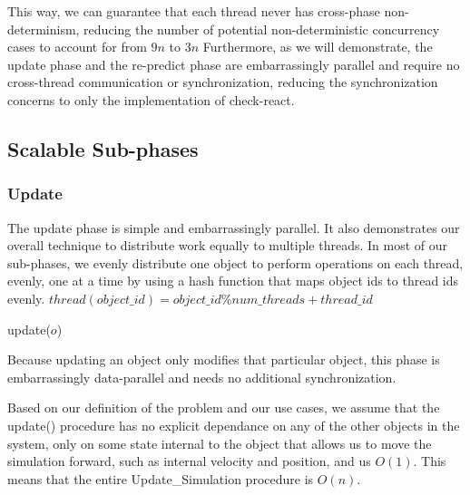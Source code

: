 \documentclass[CEJCS,PDF]{cej} %
\begin{document}
This way, we can guarantee that each thread never has cross-phase non-determinism, reducing the number of potential non-deterministic concurrency cases to account for from $9n$ to $3n$
Furthermore, as we will demonstrate, the update phase and the re-predict phase are embarrassingly parallel and require no cross-thread communication or synchronization,
reducing the synchronization concerns to only the implementation of check-react.

\subsection{Scalable Sub-phases}
\label{sec:subphase}

\subsubsection{Update}
\label{sub:update}
The update phase is simple and embarrassingly parallel.  It also demonstrates our overall technique to distribute work equally to multiple threads.  In most of our sub-phases,
we evenly distribute one object to perform operations on each thread, evenly, one at a time by using a hash function that maps object ids to thread ids evenly. $thread(object\_id) = object\_id \% num\_threads + thread\_id$
\begin{algorithmic}
	\STATE update($o$)
\ENDFOR
\end{algorithmic}

Because updating an object only modifies that particular object, this phase is embarrassingly data-parallel and needs no additional synchronization.

Based on our definition of the problem and our use cases, we assume that the update() procedure has no explicit dependance on any of the other objects
in the system, only on some state internal to the object that allows us to move the simulation forward, such as internal velocity and position, and us $O(1)$.  This means
that the entire Update\_Simulation procedure is $O(n)$.
\end{document}
